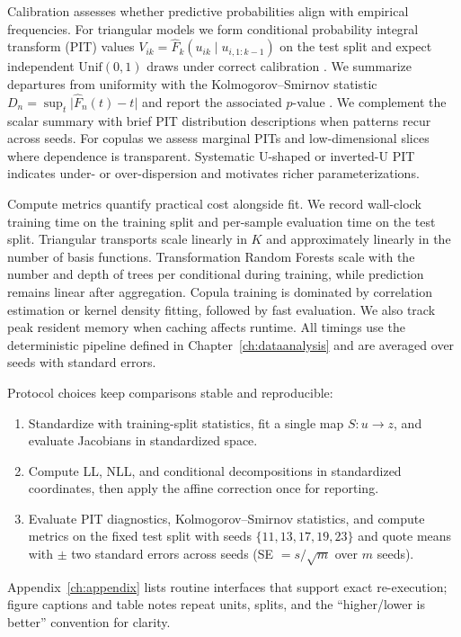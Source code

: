 \documentclass[11pt,a4paper,twoside]{book}\usepackage[]{graphicx}\usepackage[]{xcolor}
\begin{document}
Calibration assesses whether predictive probabilities align with empirical frequencies. For triangular models we form conditional probability integral transform (PIT) values $V_{ik} = \widehat{F}_k(u_{ik} \mid u_{i,1:k-1})$ on the test split and expect independent $\mathrm{Unif}(0,1)$ draws under correct calibration \citep{gneiting2007probabilistic}. We summarize departures from uniformity with the Kolmogorov--Smirnov statistic $D_n = \sup_t \lvert \widehat{F}_n(t) - t \rvert$ and report the associated $p$-value \citep{massey1951kolmogorov}. We complement the scalar summary with brief PIT distribution descriptions when patterns recur across seeds. For copulas we assess marginal PITs and low-dimensional slices where dependence is transparent. Systematic U-shaped or inverted-U PIT indicates under- or over-dispersion and motivates richer parameterizations.

Compute metrics quantify practical cost alongside fit. We record wall-clock training time on the training split and per-sample evaluation time on the test split. Triangular transports scale linearly in $K$ and approximately linearly in the number of basis functions. Transformation Random Forests scale with the number and depth of trees per conditional during training, while prediction remains linear after aggregation. Copula training is dominated by correlation estimation or kernel density fitting, followed by fast evaluation. We also track peak resident memory when caching affects runtime. All timings use the deterministic pipeline defined in Chapter~\ref{ch:dataanalysis} and are averaged over seeds with standard errors.

Protocol choices keep comparisons stable and reproducible:
\begin{enumerate}
  \item Standardize with training-split statistics, fit a single map $S:u \rightarrow z$, and evaluate Jacobians in standardized space.
  \item Compute LL, NLL, and conditional decompositions in standardized coordinates, then apply the affine correction once for reporting.
  \item Evaluate PIT diagnostics, Kolmogorov--Smirnov statistics, and compute metrics on the fixed test split with seeds $\{11, 13, 17, 19, 23\}$ and quote means with $\pm$ two standard errors across seeds (SE $= s/\sqrt{m}$ over $m$ seeds).
\end{enumerate}
Appendix~\ref{ch:appendix} lists routine interfaces that support exact re-execution; figure captions and table notes repeat units, splits, and the “higher/lower is better” convention for clarity.
\end{document}
